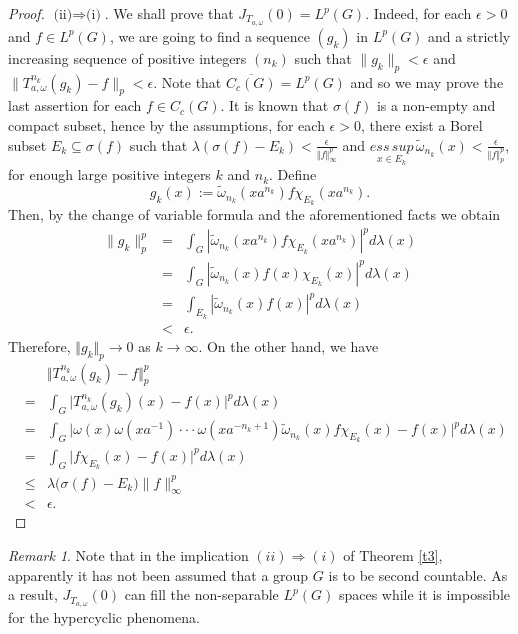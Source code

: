 \documentclass{amsart}
\theoremstyle{definition}\newtheorem{defn}[thm]{Definition}
\theoremstyle{remark}
\newtheorem{rem}[thm]{Remark}
\numberwithin{equation}{section}
\begin{document}
\begin{proof}
$\mbox{(ii)}\Rightarrow \mbox{(i)}$. We shall prove
that $J_{T_{a,\omega}}(0)=L^p(G)$. Indeed, for each $\epsilon>0$ and
$f\in L^p(G)$, we are going to find a sequence
 $(g_k)$ in $L^p(G)$ and a strictly increasing sequence of positive integers
  $(n_k)$  such that $\|g_k
\|_p<\epsilon$ and
$\|T_{a,\omega}^{n_k}(g_k)-f\|_p<\epsilon$.
 Note that
$\overline{C_c(G)}=L^p(G)$ and so  we may prove the last assertion
for each $f \in C_c(G)$.
 It is known that
$\sigma(f)$ is a non-empty and compact subset, hence by the
assumptions, for each $\epsilon>0$,  there exist a Borel subset
$E_k\subseteq \sigma(f)$  such that
$\lambda(\sigma(f)-E_k)<\frac{\epsilon} { \Vert f\Vert_{\infty}^{p}}$ and
 $\underset{x\in E_{k}}{ess\,sup}\,
\tilde{\omega}_{n_k}(x)<\frac{\epsilon}{\Vert f\Vert_p^p}$,
 for enough large positive integers $k$ and $n_k$.
Define
$$g_k(x):=\tilde{\omega}_{n_k}(xa^{n_k})f\chi_{E_k}(xa^{n_k}).$$ Then,   by the
change of variable formula and the aforementioned facts we obtain
\begin{eqnarray*}
 \|g_k\|_p^p&=&\int_G|\tilde{\omega}_{n_k}(xa^{n_k})
 f\chi_{E_k}(xa^{n_k})|^p d\lambda(x) \\
  &=&\int_G|\tilde{\omega}_{n_k}(x)f(x)\chi_{E_k}(x)|^p d\lambda(x) \\
&=& \int_{E_k}|\tilde{\omega}_{n_k}(x)f(x)|^p d\lambda(x)\\
      &<& \epsilon.
  \end{eqnarray*}
Therefore, $\Vert g_{k}\Vert_p\to 0$ as $k\to \infty$. On the other
hand, we have
\begin{eqnarray*}
&&\Vert T_{a,\omega}^{n_k}(g_k) - f\Vert_p^p
\\&=&
\int_G \vert T_{a,\omega}^{n_k}(g_k)(x) -f(x)\vert^p d\lambda(x)
\\&=&
\int_{G} \vert
\omega(x)\omega(xa^{-1})\cdot\cdot\cdot\omega(xa^{-n_k+1})\tilde{\omega}_{n_k}(x)
f\chi_{E_k}(x)-f(x)\vert^p d\lambda(x)\\
&=&\int_{G} \vert f\chi_{E_k}(x)-f(x)\vert^p d\lambda(x)\\ &\leq&
\lambda\big(\sigma(f)-E_k\big) \|f\|_{\infty}^p\\&<&\epsilon.
\end{eqnarray*}
\end{proof}
\begin{rem}
Note that in the implication $(ii)\Rightarrow (i)$ of Theorem
\ref{t3}, apparently it has not been assumed that a group  $G$ is to
be second countable. As a result, $J_{T_{a,\omega}}(0)$ can fill the
non-separable $L^p(G)$ spaces while it is impossible for the
hypercyclic phenomena.
\end{rem}
\end{document}
